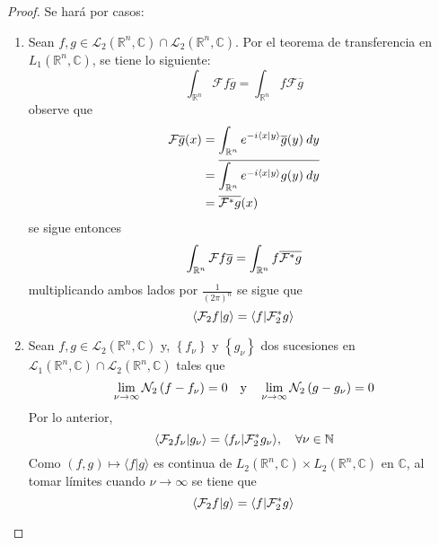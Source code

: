 \documentclass[12pt]{report}
\newcounter{it}
\theoremstyle{largebreak}
\newcommand\pint[2]{\ensuremath{\langle#1| #2\rangle}}
\newcommand\conj[1]{\ensuremath{\overline{#1}}}
\newcommand{\N}[2]{\ensuremath{\mathcal{N}_{#1}\left(#2\right)}}
\newcommand{\fou}[1]{\ensuremath{\mathcal{F}#1}}
\begin{document}
    \begin{proof}
        Se hará por casos:
        \begin{enumerate}
            \item Sean $f,g\in\mathcal{L}_2(\mathbb{R}^n,\mathbb{C})\cap\mathcal{L}_2(\mathbb{R}^n,\mathbb{C})$. Por el teorema de transferencia en $L_1(\mathbb{R}^n,\mathbb{C})$, se tiene lo siguiente:
            \begin{equation*}
                \int_{\mathbb{R}^n}\fou{f}\conj{g}=\int_{\mathbb{R}^n}f\fou{\conj{g}}
            \end{equation*}
            observe que
            \begin{equation*}
                \begin{split}
                    \fou{\conj{g}}(x)&=\int_{\mathbb{R}^n}e^{ -i\pint{x}{y}}\conj{g}(y)\:dy\\
                    &=\conj{\int_{\mathbb{R}^n}e^{ -i\pint{x}{y}}g(y)\:dy}\\
                    &=\conj{\fou^*{g}}(x)\\
                \end{split}
            \end{equation*}
            se sigue entonces
            \begin{equation*}
                \int_{\mathbb{R}^n}\fou{f}\conj{g}=\int_{\mathbb{R}^n}f\conj{\fou^*{g}}
            \end{equation*}
            multiplicando ambos lados por $\frac{1}{(2\pi)^n}$ se sigue que
            \begin{equation*}
                \pint{\fou_2{f}}{g}=\pint{f}{\fou_2^*{g}}
            \end{equation*}
            \item Sean $f,g\in\mathcal{L}_2(\mathbb{R}^n,\mathbb{C})$ y, $\left\{f_\nu\right\}$ y $\left\{g_\nu\right\}$ dos sucesiones en $\mathcal{L}_1(\mathbb{R}^n,\mathbb{C})\cap\mathcal{L}_2(\mathbb{R}^n,\mathbb{C})$ tales que
            \begin{equation*}
                \lim_{\nu\rightarrow\infty}\N{2}{f-f_\nu}=0\quad\textup{y}\quad\lim_{\nu\rightarrow\infty}\N{2}{g-g_\nu}=0
            \end{equation*}
            Por lo anterior,
            \begin{equation*}
                \pint{\fou_2{f_\nu}}{g_\nu}=\pint{f_\nu}{\fou_2^*{g_\nu}},\quad\forall\nu\in\mathbb{N}
            \end{equation*}
            Como $(f,g)\mapsto\pint{f}{g}$ es continua de $L_2(\mathbb{R}^n,\mathbb{C})\times L_2(\mathbb{R}^n,\mathbb{C})$ en $\mathbb{C}$, al tomar límites cuando $\nu\rightarrow
            \infty$ se tiene que
            \begin{equation*}
                \pint{\fou_2{f}}{g}=\pint{f}{\fou_2^*{g}}
            \end{equation*}
        \end{enumerate}
    \end{proof}
\end{document}
